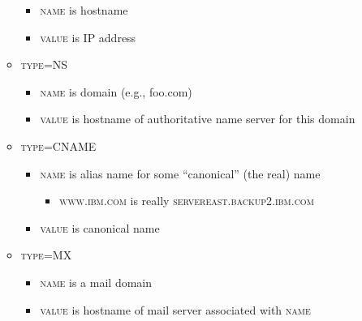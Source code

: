 \begin{itemize}
\begin{itemize}
\begin{itemize}
          \item \textsc{name} is hostname

          \item \textsc{value} is IP address

        \end{itemize}

      \item \textsc{type=NS}

        \begin{itemize}

          \item \textsc{name} is domain (e.g., foo.com)

          \item \textsc{value} is hostname of authoritative name server for this domain

        \end{itemize}

      \item \textsc{type=CNAME}

        \begin{itemize}

          \item \textsc{name} is alias name for some ``canonical'' (the real) name

            \begin{itemize}

              \item \textsc{www.ibm.com} is really \textsc{servereast.backup2.ibm.com}

            \end{itemize}

          \item \textsc{value} is canonical name

        \end{itemize}

      \item \textsc{type=MX}

        \begin{itemize}

          \item \textsc{name} is a mail domain

          \item \textsc{value} is hostname of mail server associated with \textsc{name}

        \end{itemize}

    \end{itemize}


\end{itemize}
